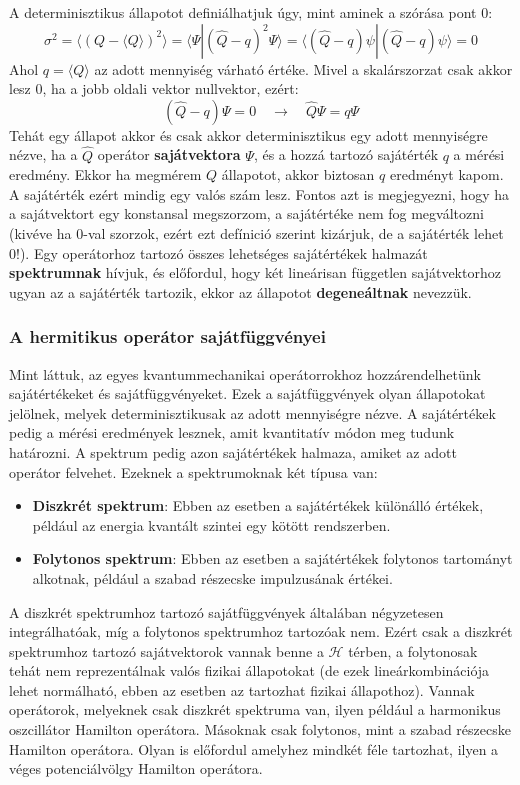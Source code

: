 \documentclass[../main.tex]{subfiles}
\begin{document}
A determinisztikus állapotot definiálhatjuk úgy, mint aminek a szórása pont 0:
\begin{equation}
    \sigma^2 = \langle (Q - \langle Q \rangle)^2 \rangle = \langle \Psi | (\hat{Q} - q )^2 \Psi \rangle = \langle (\hat{Q} - q ) \psi | (\hat{Q} - q ) \psi \rangle = 0
\end{equation}
Ahol $q = \langle Q \rangle$ az adott mennyiség várható értéke. Mivel a skalárszorzat csak akkor lesz 0, ha a jobb oldali vektor nullvektor, ezért:
\begin{equation}
    (\hat{Q} - q ) \Psi = 0 \quad \rightarrow \quad \hat{Q} \Psi = q \Psi
\end{equation}
Tehát egy állapot akkor és csak akkor determinisztikus egy adott mennyiségre nézve, ha a $\hat{Q}$ operátor \textbf{sajátvektora} $\Psi$, és a hozzá tartozó sajátérték $q$ a mérési eredmény.
Ekkor ha megmérem $Q$ állapotot, akkor biztosan $q$ eredményt kapom. A sajátérték ezért mindig egy valós szám lesz. Fontos azt is megjegyezni, hogy ha a sajátvektort egy konstansal megszorzom,
a sajátértéke nem fog megváltozni (kivéve ha 0-val szorzok, ezért ezt defínició szerint kizárjuk, de a sajátérték lehet 0!). Egy operátorhoz tartozó összes lehetséges sajátértékek halmazát \textbf{spektrumnak} hívjuk,
és előfordul, hogy két lineárisan független sajátvektorhoz ugyan az a sajátérték tartozik, ekkor az állapotot \textbf{degeneáltnak} nevezzük.

\subsubsection{A hermitikus operátor sajátfüggvényei}
Mint láttuk, az egyes kvantummechanikai operátorrokhoz hozzárendelhetünk sajátértékeket és sajátfüggvényeket. Ezek a sajátfüggvények olyan állapotokat jelölnek, melyek determinisztikusak az adott mennyiségre nézve.
A sajátértékek pedig a mérési eredmények lesznek, amit kvantitatív módon meg tudunk határozni. A spektrum pedig azon sajátértékek halmaza, amiket az adott operátor felvehet. Ezeknek a spektrumoknak két típusa van:
\begin{itemize}
    \item \textbf{Diszkrét spektrum}: Ebben az esetben a sajátértékek különálló értékek, például az energia kvantált szintei egy kötött rendszerben.
    \item \textbf{Folytonos spektrum}: Ebben az esetben a sajátértékek folytonos tartományt alkotnak, például a szabad részecske impulzusának értékei.
\end{itemize}
A diszkrét spektrumhoz tartozó sajátfüggvények általában négyzetesen integrálhatóak, míg a folytonos spektrumhoz tartozóak nem. Ezért csak a diszkrét spektrumhoz tartozó sajátvektorok vannak benne a $\mathcal{H}$ térben,
a folytonosak tehát nem reprezentálnak valós fizikai állapotokat (de ezek lineárkombinációja lehet normálható, ebben az esetben az tartozhat fizikai állapothoz). Vannak operátorok, melyeknek csak diszkrét spektruma van,
ilyen például a harmonikus oszcillátor Hamilton operátora. Másoknak csak folytonos, mint a szabad részecske Hamilton operátora. Olyan is előfordul amelyhez mindkét féle tartozhat, ilyen a véges potenciálvölgy Hamilton operátora.
\end{document}
